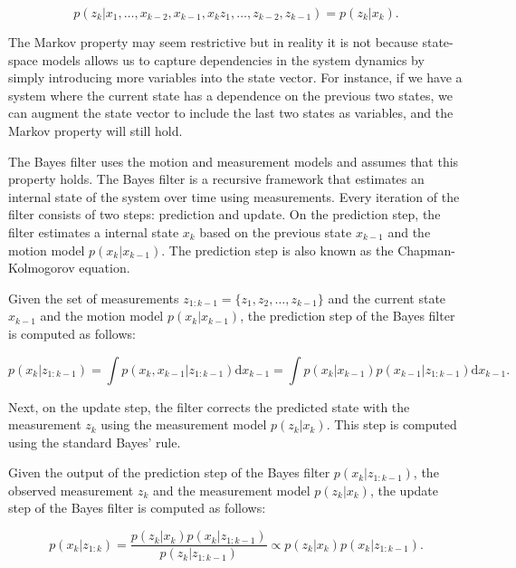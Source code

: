 $$
p(z_k | x_1, \ldots, x_{k-2}, x_{k-1}, x_{k}
        z_1, \ldots, z_{k-2}, z_{k-1}) 
    = p(z_k | x_k).
$$

The Markov property may seem restrictive but in reality it is not because state-
space models allows us to capture dependencies in the system dynamics by simply 
introducing more variables into the state vector. For instance, if we have a 
system where the current state has a dependence on the previous two states, we 
can augment the state vector to include the last two states as variables, and 
the Markov property will still hold.

The Bayes filter uses the motion and measurement models and assumes that this
property holds. The Bayes filter is a recursive framework that estimates an
internal state of the system over time using measurements. Every iteration of
the filter consists of two steps: prediction and update. On the prediction step,
the filter estimates a internal state $x_k$ based on the previous state
$x_{k-1}$ and the motion model $p(x_k | x_{k-1})$. The prediction step
is also known as the Chapman-Kolmogorov equation.

\begin{theorem}\label{theorem:bayes-filter-predict}\label{theorem:chapman-kolmogorov}
    Given the set of measurements $z_{1:k-1} = \{z_1, z_2, \ldots, z_{k-1}\}$ 
    and the current state $x_{k-1}$ and the motion model $p(x_k | x_{k-1})$, 
    the prediction step of the Bayes filter is computed as follows:

    $$
    p\left({x}_k | {z}_{1: k-1}\right)
        = \int 
            p\left(
                {x}_k, {x}_{k-1} | {z}_{1: k-1}
            \right)
            \mathrm{d} {x}_{k-1}
        = \int
            p\left(
                {x}_k | {x}_{k-1}\right
            ) p\left(
                {x}_{k-1} | {z}_{1: k-1}
            \right)
            \mathrm{d} {x}_{k-1}.
    $$
\end{theorem}

Next, on the update step, the filter corrects the predicted state with the 
measurement $z_k$ using the measurement model $p(z_k | x_k)$. This step is
computed using the standard Bayes' rule.

\begin{theorem}\label{theorem:bayes-filter-update}
    Given the output of the prediction step of the Bayes filter 
    $p\left({x}_k | {z}_{1: k-1}\right)$, the observed measurement $z_k$
    and the measurement model $p(z_k | x_k)$, the update step of the Bayes
    filter is computed as follows:
    
    $$
    p\left({x}_k | {z}_{1: k}\right)=\frac{p\left({z}_k | {x}_k\right) p\left({x}_k | {z}_{1: k-1}\right)}{p\left({z}_k | {z}_{1: k-1}\right)} \propto p\left({z}_k | {x}_k\right) p\left({x}_k | {z}_{1: k-1}\right).
    $$
\end{theorem}


